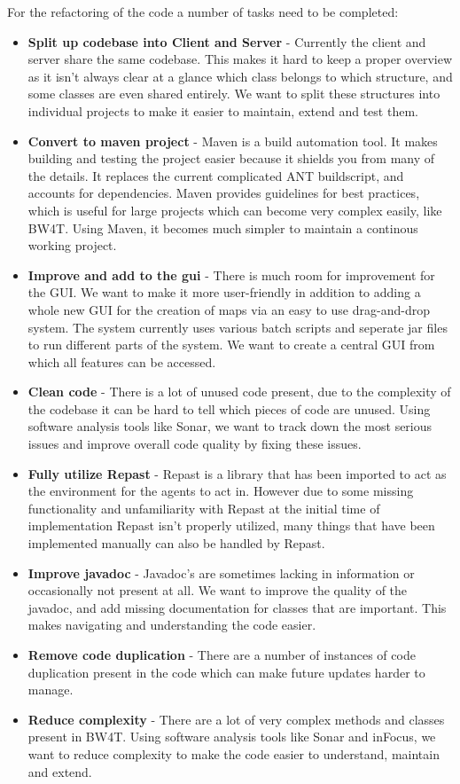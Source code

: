 For the refactoring of the code a number of tasks need to be completed:
\begin{itemize}
  \item
  \textbf{Split up codebase into Client and Server} - Currently the client and
  server share the same codebase. This makes it hard to keep a proper overview as
  it isn't always clear at a glance which class belongs to which structure, and
  some classes are even shared entirely. We want to split these structures into
  individual projects to make it easier to maintain, extend and test them. 
  \item
  \textbf{Convert to \Gls{maven} project} - Maven is a build automation tool. It makes building and testing the project easier because it shields you from many of the details. It replaces the current complicated ANT buildscript, and accounts for dependencies. Maven provides guidelines for best practices, which is useful for large projects which can become very complex easily, like BW4T. Using Maven, it becomes much simpler to maintain a continous working project.
  \item
  \textbf{Improve and add to the \gls{gui}} - There is much room for improvement for
  the GUI. We want to make it more user-friendly in addition to adding a whole
  new GUI for the creation of maps via an easy to use drag-and-drop system. The system currently uses various batch scripts and seperate jar files to run different parts of the system. We want to create a central GUI from which all features can be accessed. 
  \item
  \textbf{Clean code} - There is a lot of unused code present, due to the
  complexity of the codebase it can be hard to tell which pieces of code are
  unused. Using software analysis tools like Sonar, we want to track down the most serious issues and improve overall code quality by fixing these issues. 
  \item
  \textbf{Fully utilize Repast} - Repast is a library that has been imported to
  act as the environment for the agents to act in. However due to some missing
  functionality and unfamiliarity with Repast at the initial time of implementation
  Repast isn't properly utilized, many things that have been implemented manually
  can also be handled by Repast.
  \item
  \textbf{Improve \gls{javadoc}} - Javadoc's are sometimes lacking in information or
  occasionally not present at all. We want to improve the quality of the javadoc, and add missing documentation for classes that are important. This makes navigating and understanding the code easier. 
  \item
  \textbf{Remove code duplication} - There are a number of instances of code
  duplication present in the code which can make future updates harder to manage.
    \item
  \textbf{Reduce complexity} - There are a lot of very complex methods and classes present in BW4T. Using software analysis tools like Sonar and inFocus, we want to reduce complexity to make the code easier to understand, maintain and extend. 
\end{itemize}
